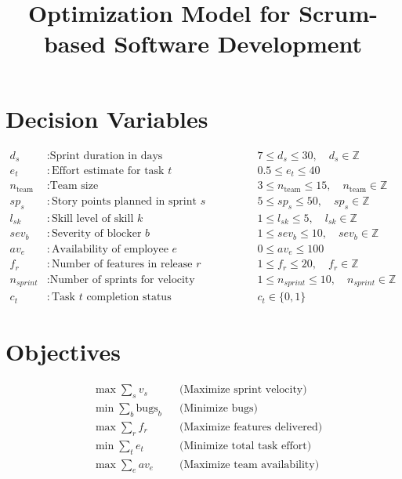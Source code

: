 \documentclass{article}
\title{Optimization Model for Scrum-based Software Development}
\author{}
\date{}
\begin{document}
\maketitle

\section*{Decision Variables}
\begin{align*}
d_s & : \text{Sprint duration in days} && 7 \leq d_s \leq 30, \quad d_s \in \mathbb{Z} \\
e_t & : \text{Effort estimate for task } t && 0.5 \leq e_t \leq 40 \\
n_{\text{team}} & : \text{Team size} && 3 \leq n_{\text{team}} \leq 15, \quad n_{\text{team}} \in \mathbb{Z} \\
sp_s & : \text{Story points planned in sprint } s && 5 \leq sp_s \leq 50, \quad sp_s \in \mathbb{Z} \\
l_{sk} & : \text{Skill level of skill } k && 1 \leq l_{sk} \leq 5, \quad l_{sk} \in \mathbb{Z} \\
sev_b & : \text{Severity of blocker } b && 1 \leq sev_b \leq 10, \quad sev_b \in \mathbb{Z} \\
av_e & : \text{Availability of employee } e && 0 \leq av_e \leq 100 \\
f_r & : \text{Number of features in release } r && 1 \leq f_r \leq 20, \quad f_r \in \mathbb{Z} \\
n_{sprint} & : \text{Number of sprints for velocity calculation} && 1 \leq n_{sprint} \leq 10, \quad n_{sprint} \in \mathbb{Z} \\
c_t & : \text{Task } t \text{ completion status} && c_t \in \{0,1\}
\end{align*}

\section*{Objectives}
\begin{align*}
& \max \sum_{s} v_s && \text{(Maximize sprint velocity)} \\
& \min \sum_b \text{bugs}_b && \text{(Minimize bugs)} \\
& \max \sum_r f_r && \text{(Maximize features delivered)} \\
& \min \sum_t e_t && \text{(Minimize total task effort)} \\
& \max \sum_e av_e && \text{(Maximize team availability)} \\
\end{align*}
\end{document}

